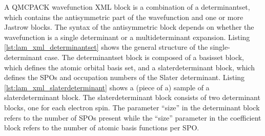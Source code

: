 A QMCPACK wavefunction XML block is a combination of a determinantset, which
contains the antisymmetric part of the wavefunction and one or more Jastrow blocks.
The syntax of the antisymmetric block depends on whether the wavefunction is a single
determinant or a multideterminant expansion. Listing \ref{lst:lam_xml_determinantset} 
shows the general structure of the
single-determinant case. The determinantset block is composed of a basisset block, which
defines the atomic orbital basis set, and a slaterdeterminant block, which defines the SPOs and occupation numbers of the Slater determinant.
 Listing \ref{lst:lam_xml_slaterdeterminant} shows a (piece of a) sample of a 
slaterdeterminant block. The
slaterdeterminant block consists of two determinant blocks, one for each electron spin. The
parameter ``size” in the determinant block refers to the number of SPOs
present while the ``size” parameter in the coefficient block refers to the number of atomic
basis functions per SPO.

